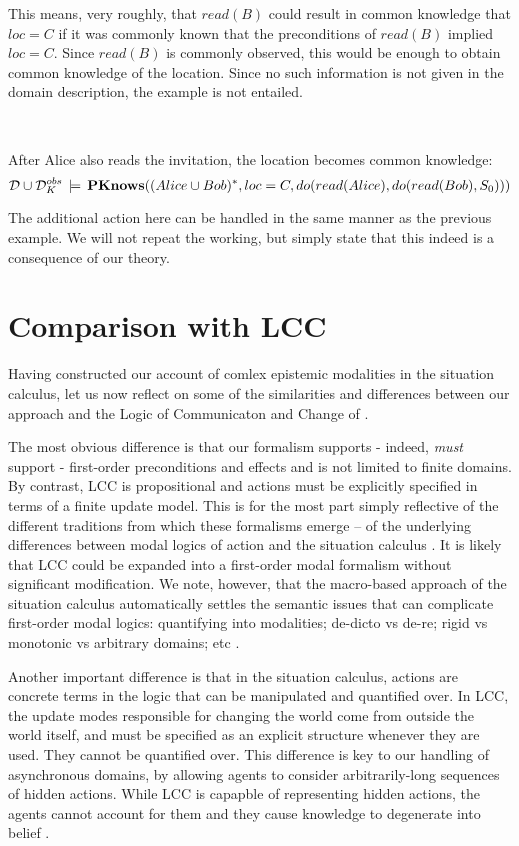 This means, very roughly, that $read(B)$ could result in common knowledge
that $loc=C$ if it was commonly known that the preconditions of $read(B)$
implied $loc=C$. Since $read(B)$ is commonly observed, this would
be enough to obtain common knowledge of the location. Since no such
information is not given in the domain description, the example is
not entailed.

~

\begin{example}
After Alice also reads the invitation, the location becomes common
knowledge:\[
\mathcal{D}\cup\mathcal{D}_{K}^{obs}\,\models\,\mathbf{PKnows}((Alice\cup Bob)^{*},loc=C,do(read(Alice),do(read(Bob),S_{0})))\]

\end{example}
The additional action here can be handled in the same manner as the
previous example. We will not repeat the working, but simply state
that this indeed is a consequence of our theory.


\section{Comparison with LCC\label{sec:CKnowledge:Comparison}}

Having constructed our account of comlex epistemic modalities in the
situation calculus, let us now reflect on some of the similarities
and differences between our approach and the Logic of Communicaton
and Change of \citet{vanBenthem06lcc}.

The most obvious difference is that our formalism supports - indeed,
\emph{must} support - first-order preconditions and effects and is
not limited to finite domains. By contrast, LCC is propositional and
actions must be explicitly specified in terms of a finite update model.
This is for the most part simply reflective of the different traditions
from which these formalisms emerge -- of the underlying differences
between modal logics of action and the situation calculus \citep{vanbentham07ml_sitcalc}.
It is likely that LCC could be expanded into a first-order modal formalism
without significant modification. We note, however, that the macro-based
approach of the situation calculus automatically settles the semantic
issues that can complicate first-order modal logics: quantifying into
modalities; de-dicto vs de-re; rigid vs monotonic vs arbitrary domains;
etc \citep{fitting98fo_ml}.

Another important difference is that in the situation calculus, actions
are concrete terms in the logic that can be manipulated and quantified
over. In LCC, the update modes responsible for changing the world
come from outside the world itself, and must be specified as an explicit
structure whenever they are used. They cannot be quantified over.
This difference is key to our handling of asynchronous domains, by
allowing agents to consider arbitrarily-long sequences of hidden actions.
While LCC is capapble of representing hidden actions, the agents cannot
account for them and they cause knowledge to degenerate into belief
\citep[section 5.2]{vanBenthem06lcc}.

